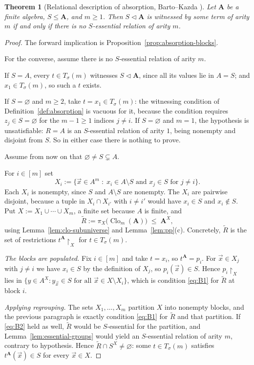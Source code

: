 \documentclass[11pt]{article}
\theoremstyle{mainplain}
\newtheorem{theorem}{Theorem}[section]
\theoremstyle{mainroman}
\theoremstyle{definition}
\numberwithin{equation}{section}
\DeclareMathOperator{\Clo}{Clo}
\newcommand{\bA}{\mathbf A}
\newcommand{\ab}{\lhd}
\newcommand{\Tm}{T_\sigma}
\begin{document}
\begin{theorem}[Relational description of absorption, Barto--Kazda \cite{BartoKazda}]\label{thm:relational-absorption}
Let $\bA$ be a finite algebra, $S\le\bA$, and $m\ge1$. Then $S\ab\bA$ is
witnessed by some term of arity $m$ if and only if there is no $S$-essential
relation of arity $m$.
\end{theorem}
\begin{proof}
The forward implication is Proposition~\ref{prop:absorption-blocks}.

For the converse, assume there is no $S$-essential relation of arity $m$.

If $S=A$, every $t\in\Tm(m)$ witnesses $S\ab\bA$, since all its values lie in
$A=S$; and $x_1\in\Tm(m)$, so such a $t$ exists.

If $S=\varnothing$ and $m\ge2$, take $t=x_1\in\Tm(m)$: the witnessing
condition of Definition~\ref{def:absorption} is vacuous for it, because the
condition requires $z_j\in S=\varnothing$ for the $m-1\ge1$ indices $j\ne i$. If $S=\varnothing$ and $m=1$, the hypothesis is
unsatisfiable: $R=A$ is an $S$-essential relation of arity $1$, being nonempty
and disjoint from $S$. So in either case there is nothing to prove.

Assume from now on that $\varnothing\ne S\subsetneq A$.

For $i\in[m]$ set
\[
 X_i:=\{\vec x\in A^m\;:\;x_i\in A\setminus S\text{ and }x_j\in S\text{ for }j\ne i\}.
\]
Each $X_i$ is nonempty, since $S$ and $A\setminus S$ are nonempty. The $X_i$ are
pairwise disjoint, because a tuple in $X_i\cap X_{i'}$ with $i\ne i'$ would have
$x_i\in S$ and $x_i\notin S$. Put $X:=X_1\cup\cdots\cup X_m$, a finite set
because $A$ is finite, and
\[
 \widetilde R:=\pi_{X}\bigl(\Clo_m(\bA)\bigr)\;\le\;\bA^{X},
\]
using Lemma~\ref{lem:clo-subuniverse} and Lemma~\ref{lem:pp}(c). Concretely,
$\widetilde R$ is the set of restrictions $t^{\bA}\!\restriction_X$ for
$t\in\Tm(m)$.

\emph{The blocks are populated.} Fix $i\in[m]$ and take $t=x_i$, so
$t^{\bA}=p_i$. For $\vec x\in X_j$ with $j\ne i$ we have $x_i\in S$ by the
definition of $X_j$, so $p_i(\vec x)\in S$. Hence $p_i\!\restriction_X$ lies in
$\{y\in A^{X}:y_{\vec x}\in S\text{ for all }\vec x\in X\setminus X_i\}$, which
is condition \eqref{eq:B1} for $\widetilde R$ at block $i$.

\emph{Applying regrouping.} The sets $X_1,\dots,X_m$ partition $X$ into
nonempty blocks, and the previous paragraph is exactly condition
\eqref{eq:B1} for $\widetilde R$ and that partition. If \eqref{eq:B2} held as
well, $\widetilde R$ would be $S$-essential for the partition, and
Lemma~\ref{lem:essential-groups} would yield an $S$-essential relation of arity
$m$, contrary to hypothesis. Hence $\widetilde R\cap S^{X}\ne\varnothing$:
some $t\in\Tm(m)$ satisfies $t^{\bA}(\vec x)\in S$ for every $\vec x\in X$.


\end{proof}
\end{document}
